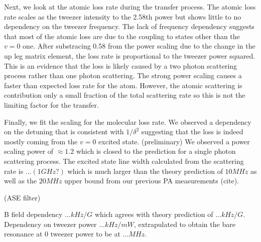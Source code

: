 \documentclass[aps,prl,twocolumn,groupedaddress]{revtex4-1}
\newcommand{\todo}[1]{}
\begin{document}
Next, we look at the atomic loss rate during the transfer process.
The atomic loss rate scales as the tweezer intensity to the 2.58th power but shows little to no dependency on the tweezer frequency. The lack of frequency dependency suggests that most of the atomic loss are due to the coupling to states other than the $v=0$ one. After substracing 0.58 from the power scaling due to the change in the up leg matrix element, the loss rate is proportional to the tweezer power squared. This is an evidence that the loss is likely caused by a two photon scattering process rather than one photon scattering. The strong power scaling causes a faster than expected loss rate for the atom. However, the atomic scattering is contribution only a small fraction of the total scattering rate so this is not the limiting factor for the transfer.

Finally, we fit the scaling for the molecular loss rate. We observed a dependency on the detuning that is consistent with $1/\delta^2$ suggesting that the loss is indeed mostly coming from the $v=0$ excited state. (preliminary) We observed a power scaling power of $\approx1.2$ which is closed to the prediction for a single photon scattering process. The excited state line width calculated from the scattering rate is $...(1 GHz?)$ which is much larger than the theory prediction of $10 MHz$ as well as the $20 MHz$ upper bound from our previous PA measurements (cite).

(ASE filter)









B field dependency $... kHz/G$ which agrees with theory prediction of $... kHz/G$.
Dependency on tweezer power $... kHz/mW$, extrapulated to obtain the bare resonance at $0$ tweezer power to be at $... MHz$.

\todo{sm: STIRAP vs Raman}

%


\end{document}
